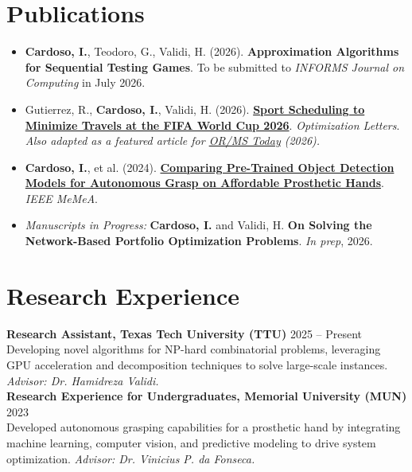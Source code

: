 \documentclass[letterpaper,10pt]{article}
\newcommand{\dategray}[1]{\textcolor{textgray}{#1}}
\begin{document}
\section{Publications}
\begin{itemize}[leftmargin=14pt, nosep, topsep=2pt, itemsep=2pt]
    \item \textbf{Cardoso, I.}, Teodoro, G., Validi, H. (2026). \textbf{Approximation Algorithms for Sequential Testing Games}. To be submitted to \textit{INFORMS Journal on Computing} in July 2026.
    \item Gutierrez, R., \textbf{Cardoso, I.}, Validi, H. (2026). \href{https://doi.org/10.1007/s11590-026-02320-x}{\textbf{Sport Scheduling to Minimize Travels at the FIFA World Cup 2026}}. \textit{Optimization Letters}. \small{\textit{Also adapted as a featured article for \href{https://pubsonline.informs.org/do/10.1287/orms.2026.02.11/full/}{OR/MS Today} (2026).}}
    \item \textbf{Cardoso, I.}, et al. (2024). \href{https://ieeexplore.ieee.org/document/10596873}{\textbf{Comparing Pre-Trained Object Detection Models for Autonomous Grasp on Affordable Prosthetic Hands}}. \textit{IEEE MeMeA}.
    \item \textit{Manuscripts in Progress:} \textbf{Cardoso, I.} and Validi, H. \textbf{On Solving the Network-Based Portfolio Optimization Problems}. \textit{In prep}, 2026.
\end{itemize}

\section{Research Experience}
\textbf{Research Assistant, Texas Tech University (TTU)} \hfill \dategray{2025 – Present} \\
Developing novel algorithms for NP-hard combinatorial problems, leveraging GPU acceleration and decomposition techniques to solve large-scale instances. \textit{Advisor: Dr. Hamidreza Validi.} \\[3pt]
\textbf{Research Experience for Undergraduates, Memorial University (MUN)} \hfill \dategray{2023} \\
Developed autonomous grasping capabilities for a prosthetic hand by integrating machine learning, computer vision, and predictive modeling to drive system optimization. \textit{Advisor: Dr. Vinicius P. da Fonseca.}

\end{document}
